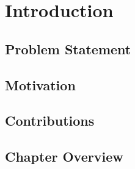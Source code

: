 \chapter{Introduction}
\label{chap:introduction}
\section{Problem Statement}
\section{Motivation}
\section{Contributions}
\section{Chapter Overview}
